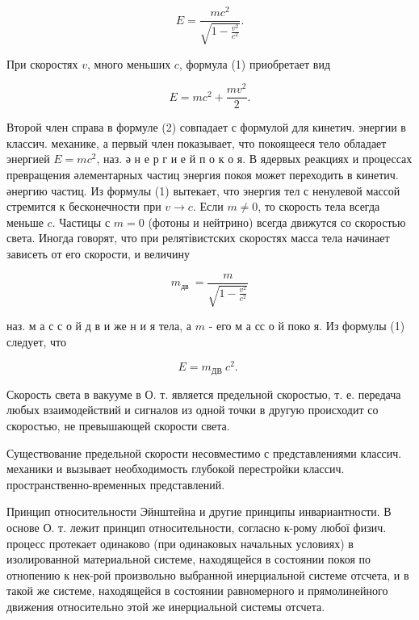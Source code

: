 \documentclass[10pt]{article}
\begin{document}
\[

E=\frac{m c^{2}}{\sqrt{1-\frac{v^{2}}{c^{2}}}} .

\]



При скоростях $v$, много меньших $c$, формула (1) приобретает вид



\[

E=m c^{2}+\frac{m v^{2}}{2} .

\]



Второй член справа в формуле (2) совпадает с формулой для кинетич. энергии в классич. механике, а первый член показывает, что покоящееся тело обладает энергией $E=m c^{2}$, наз. ә н е р г и е й п о к о я. В ядервых реакциях и процессах превращения әлементарных частиц энергия покоя может переходить в кинетич. әнергию частиц. Из формулы (1) вытекает, что энергия тел с ненулевой массой стремится к бесконечности при $v \rightarrow c$. Если $m \neq 0$, то скорость тела всегда меньше $c$. Частицы с $m=0$ (фотоны и нейтрино) всегда движутся со скоростью света. Иногда говорят, что при релятівистских скоростях масса тела начинает зависеть от его скорости, и величину



\[

m_{\text {дв }}=\frac{m}{\sqrt{1-\frac{v^{2}}{c^{2}}}}

\]



наз. м а с с о й д в и же н и я тела, а $m$ - его м а сс о й поко я. Из формулы (1) следует, что



\[

E=m_{\text {ДВ }} c^{2} \text {. }

\]



Скорость света в вакууме в О. т. является предельной скоростью, т. е. передача любых взаимодействий и сигналов из одной точки в другую происходит со скоростью, не превышающей скорости света.



Существование предельной скорости несовместимо с представлениями классич. механики и вызывает необходимость глубокой перестройки классич. пространственно-временных представлений.



Принцип относительности Эйнштейна и другие принципы инвариантности. В основе О. т. лежит принцип относительности, согласно к-рому любої физич. процесс протекает одинаково (при одинаковых начальных условиях) в изолированной материальной системе, находящейся в состоянии покоя по отнопению к нек-рой произвольно выбранной инерциальной системе отсчета, и в такой же системе, находящейся в состоянии равномерного и прямолинейного движения относительно этой же инерциальной системы отсчета.
\end{document}
